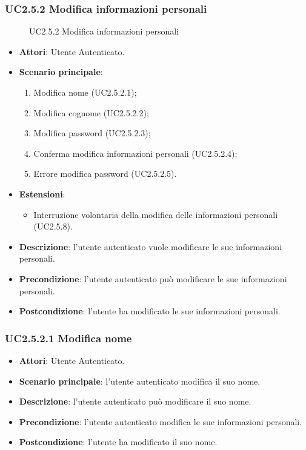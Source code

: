 \subsubsection{UC2.5.2 Modifica informazioni personali}
\begin{figure}[H]
\centering
\noindent{}
\caption{UC2.5.2 Modifica informazioni personali}
\end{figure}
\begin{itemize}
\item \textbf{Attori}: Utente Autenticato.
\item \textbf{Scenario principale}:
\begin{enumerate}
\item Modifica nome (UC2.5.2.1);
\item Modifica cognome (UC2.5.2.2);
\item Modifica password (UC2.5.2.3);
\item Conferma modifica informazioni personali (UC2.5.2.4);
\item Errore modifica password (UC2.5.2.5).
\end{enumerate}
\item \textbf{Estensioni}:
\begin{itemize}
\item Interruzione volontaria della modifica delle informazioni personali (UC2.5.8).
\end{itemize}
\item \textbf{Descrizione}: l'utente autenticato vuole modificare le sue informazioni personali.
\item \textbf{Precondizione}: l'utente autenticato può modificare le sue informazioni personali.
\item \textbf{Postcondizione}: l'utente ha modificato le sue informazioni personali.
\end{itemize}
\subsubsection{UC2.5.2.1 Modifica nome}
\begin{itemize}
\item \textbf{Attori}: Utente Autenticato.
\item \textbf{Scenario principale}: l'utente autenticato modifica il suo nome.
\item \textbf{Descrizione}: l'utente autenticato può modificare il suo nome.
\item \textbf{Precondizione}: l'utente autenticato modifica le sue informazioni personali.
\item \textbf{Postcondizione}: l'utente ha modificato il suo nome.
\end{itemize}
